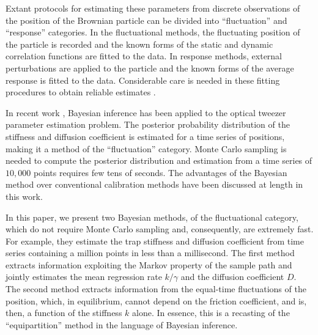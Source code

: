 \documentclass[english,aps, onecolumn, prl,superscriptaddress, notitlepage]{revtex4-1}
\begin{document}
Extant protocols for estimating these parameters from discrete observations
of the position of the Brownian particle can be divided into ``fluctuation''
and ``response'' categories. In the fluctuational methods, the fluctuating
position of the particle is recorded and the known forms of the static
and dynamic correlation functions are fitted to the data. In response
methods, external perturbations are applied to the particle and the
known forms of the average response is fitted to the data. Considerable
care is needed in these fitting procedures to obtain reliable estimates
\cite{berg2004power}. 

In recent work \cite{richly2013calibrating}, Bayesian inference has
been applied to the optical tweezer parameter estimation problem.
The posterior probability distribution of the stiffness and diffusion
coefficient is estimated for a time series of positions, making it
a method of the ``fluctuation'' category. Monte Carlo sampling is
needed to compute the posterior distribution and estimation from a
time series of $10,000$ points requires few tens of seconds. The
advantages of the Bayesian method over conventional calibration methods
have been discussed at length in this work.

In this paper, we present two Bayesian methods, of the fluctuational
category, which do not require Monte Carlo sampling and, consequently,
are extremely fast. For example, they estimate the trap stiffness
and diffusion coefficient from time series containing a million points
in less than a millisecond. The first method extracts information
exploiting the Markov property of the sample path and jointly estimates
the mean regression rate $k/\gamma$ and the diffusion coefficient
$D$. The second method extracts information from the equal-time fluctuations
of the position, which, in equilibrium, cannot depend on the friction
coefficient, and is, then, a function of the stiffness $k$ alone.
In essence, this is a recasting of the ``equipartition'' method
in the language of Bayesian inference.
\end{document}
